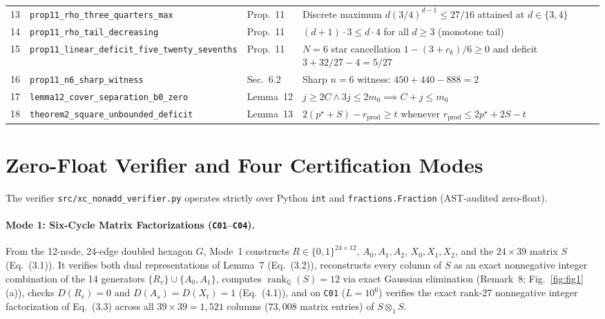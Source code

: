 \documentclass[10pt,twocolumn]{article}
\begin{document}
\begin{table}[tb]
\begin{tabular}{@{}rllp{6.7cm}@{}}
13 & \texttt{prop11\_rho\_three\_quarters\_max} & Prop.~11 & Discrete maximum $d(3/4)^{d-1} \leq 27/16$ attained at $d \in \{3, 4\}$ \\
14 & \texttt{prop11\_rho\_tail\_decreasing} & Prop.~11 & $(d+1)\cdot 3 \leq d\cdot 4$ for all $d \geq 3$ (monotone tail) \\
15 & \texttt{prop11\_linear\_deficit\_five\_twenty\_sevenths} & Prop.~11 & $N=6$ star cancellation $1-(3+c_k)/6 \geq 0$ and deficit $3+32/27-4=5/27$ \\
16 & \texttt{prop11\_n6\_sharp\_witness} & Sec.~6.2 & Sharp $n=6$ witness: $450 + 440 - 888 = 2$ \\
17 & \texttt{lemma12\_cover\_separation\_b0\_zero} & Lemma~12 & $j \geq 2C \wedge 3j \leq 2m_0 \implies C + j \leq m_0$ \\
18 & \texttt{theorem2\_square\_unbounded\_deficit} & Lemma~13 & $2(p^\star + S) - r_{\mathrm{prod}} \geq t$ whenever $r_{\mathrm{prod}} \leq 2p^\star + 2S - t$ \\
\bottomrule
\end{tabular}
\end{table}

\section{Zero-Float Verifier and Four Certification Modes}
The verifier \texttt{src/xc\_nonadd\_verifier.py} operates strictly over Python \texttt{int} and \texttt{fractions.Fraction} (AST-audited zero-float).

\paragraph{Mode 1: Six-Cycle Matrix Factorizations (\texttt{C01}--\texttt{C04}).}
From the 12-node, 24-edge doubled hexagon $G$, Mode~1 constructs $R \in \{0,1\}^{24\times 12}$, $A_0, A_1, A_2$, $X_0, X_1, X_2$, and the $24\times 39$ matrix $S$ (Eq.~(3.1)). It verifies both dual representations of Lemma~7 (Eq.~(3.2)), reconstructs every column of $S$ as an exact nonnegative integer combination of the 14 generators $\{R_v\} \cup \{A_0, A_1\}$, computes $\operatorname{rank}_{\mathbb{Q}}(S) = 12$ via exact Gaussian elimination (Remark~8; Fig.~\ref{fig:fig1}(a)), checks $D(R_v)=0$ and $D(A_s)=D(X_t)=1$ (Eq.~(4.1)), and on \texttt{C01} ($L=10^6$) verifies the exact rank-27 nonnegative integer factorization of Eq.~(3.3) across all $39 \times 39 = 1{,}521$ columns ($73{,}008$ matrix entries) of $S \otimes_1 S$.
\end{document}
